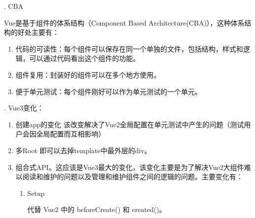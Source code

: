 . CBA

Vue是基于组件的体系结构（Component Based Architecture(CBA)），这种体系结构的好处主要有：
\begin{enumerate}
  \item 代码的可读性：每个组件可以保存在同一个单独的文件，包括结构，样式和逻辑，可以通过代码看出这个组件的功能。
  \item 组件复用：封装好的组件可以在多个地方使用。
  \item 便于单元测试：每个组件刚好可以作为单元测试的一个单元。
\end{enumerate}

. Vue3变化：
\begin{enumerate}
  \item 创建app的变化
        该改变解决了Vue2全局配置在单元测试中产生的问题（测试用户会因全局配置而互相影响）
  \item 多Root
        即可以去掉template中最外层的div。
  \item 组合式API。这应该是Vue3最大的变化，该变化主要是为了解决Vue2大组件难以阅读和维护的问题以及管理和维护组件之间的逻辑的问题。主要变化有：
        \begin{enumerate}[label=\circled{\arabic*}]
          \item Setup

                代替 Vue2 中的 beforeCreate() 和 created()。


\end{enumerate}
\end{enumerate}
